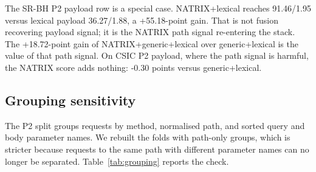 \documentclass[preprint,11pt]{elsarticle}
\begin{document}
The SR-BH P2 payload row is a special case. NATRIX+lexical reaches
91.46/1.95 versus lexical payload 36.27/1.88, a +55.18-point gain. That
is not fusion recovering payload signal; it is the NATRIX path signal
re-entering the stack. The +18.72-point gain of NATRIX+generic+lexical
over generic+lexical is the value of that path signal. On CSIC P2
payload, where the path signal is harmful, the NATRIX score adds
nothing: -0.30 points versus generic+lexical.

\subsection{Grouping sensitivity}\label{grouping-sensitivity}

The P2 split groups requests by method, normalised path, and sorted
query and body parameter names. We rebuilt the folds with path-only
groups, which is stricter because requests to the same path with
different parameter names can no longer be separated. Table~\ref{tab:grouping} reports
the check.
\end{document}
